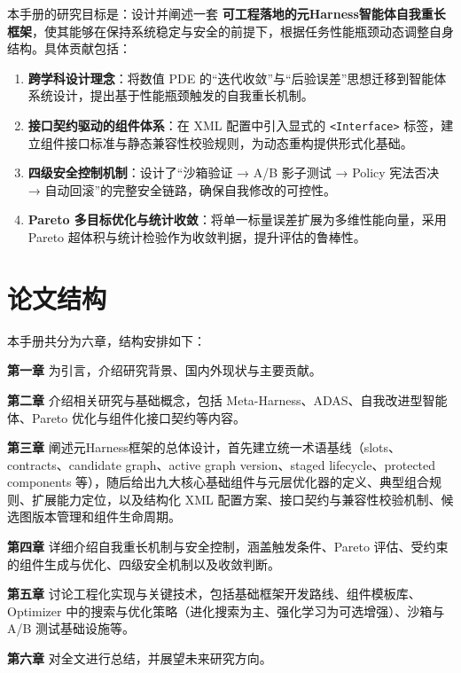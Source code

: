本手册的研究目标是：设计并阐述一套 \textbf{可工程落地的元Harness智能体自我重长框架}，使其能够在保持系统稳定与安全的前提下，根据任务性能瓶颈动态调整自身结构。具体贡献包括：

\begin{enumerate}
    \item \textbf{跨学科设计理念}：将数值 PDE 的“迭代收敛”与“后验误差”思想迁移到智能体系统设计，提出基于性能瓶颈触发的自我重长机制。
    \item \textbf{接口契约驱动的组件体系}：在 XML 配置中引入显式的 \texttt{<Interface>} 标签，建立组件接口标准与静态兼容性校验规则，为动态重构提供形式化基础。
    \item \textbf{四级安全控制机制}：设计了“沙箱验证 → A/B 影子测试 → Policy 宪法否决 → 自动回滚”的完整安全链路，确保自我修改的可控性。
    \item \textbf{Pareto 多目标优化与统计收敛}：将单一标量误差扩展为多维性能向量，采用 Pareto 超体积与统计检验作为收敛判据，提升评估的鲁棒性。
\end{enumerate}

\section{论文结构}

本手册共分为六章，结构安排如下：

\textbf{第一章} 为引言，介绍研究背景、国内外现状与主要贡献。

\textbf{第二章} 介绍相关研究与基础概念，包括 Meta-Harness、ADAS、自我改进型智能体、Pareto 优化与组件化接口契约等内容。

\textbf{第三章} 阐述元Harness框架的总体设计，首先建立统一术语基线（slots、contracts、candidate graph、active graph version、staged lifecycle、protected components 等），随后给出九大核心基础组件与元层优化器的定义、典型组合规则、扩展能力定位，以及结构化 XML 配置方案、接口契约与兼容性校验机制、候选图版本管理和组件生命周期。

\textbf{第四章} 详细介绍自我重长机制与安全控制，涵盖触发条件、Pareto 评估、受约束的组件生成与优化、四级安全机制以及收敛判断。

\textbf{第五章} 讨论工程化实现与关键技术，包括基础框架开发路线、组件模板库、Optimizer 中的搜索与优化策略（进化搜索为主、强化学习为可选增强）、沙箱与 A/B 测试基础设施等。

\textbf{第六章} 对全文进行总结，并展望未来研究方向。
